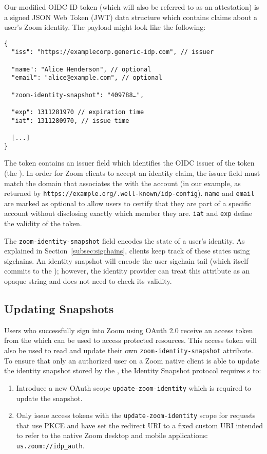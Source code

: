 Our modified OIDC ID token (which will also be referred to as an \idp attestation) is a signed JSON
Web Token (JWT) data structure which contains claims about a user's Zoom identity. The payload might
look like the following:

\begin{Verbatim}
{
  "iss": "https://examplecorp.generic-idp.com", // issuer

  "name": "Alice Henderson", // optional
  "email": "alice@example.com", // optional

  "zoom-identity-snapshot": "409788…",

  "exp": 1311281970 // expiration time
  "iat": 1311280970, // issue time

  [...]
}
\end{Verbatim}

The token contains an issuer field which identifies the OIDC issuer of the token (the \idp). In
order for Zoom clients to accept an identity claim, the issuer field must match the domain that
associates the \idp with the account (in our example, as returned by
\texttt{https://example.org/.well-known/idp-config}). \texttt{name} and \texttt{email} are marked as
optional to allow users to certify that they are part of a specific account without disclosing
exactly which member they are. \texttt{iat} and \texttt{exp} define the validity of the token.

The \texttt{zoom-identity-snapshot} field encodes the state of a user's identity. As explained in
Section~\ref{subsec:sigchains}, clients keep track of these states using sigchains. An identity
snapshot will encode the user sigchain tail (which itself commits to the \userID); however, the
identity provider can treat this attribute as an opaque string and does not need to check its
validity.

\subsection{Updating Snapshots}
Users who successfully sign into Zoom using OAuth 2.0 receive an access token from the \idp which
can be used to access protected resources. This access token will also be used to read and update
their own \texttt{zoom-identity-snapshot} attribute. To ensure that only an authorized user on a
Zoom native client is able to update the identity snapshot stored by the \idp, the Identity Snapshot
protocol requires {\idp}s to:

\begin{enumerate}
\item Introduce a new OAuth scope \texttt{update-zoom-identity} which is required to update the
    snapshot.
\item Only issue access tokens with the \texttt{update-zoom-identity} scope for requests that use
    PKCE and have set the redirect URI to a fixed custom URI intended to refer to the native Zoom
    desktop and mobile applications: \texttt{us.zoom://idp\_auth}.
\end{enumerate}

